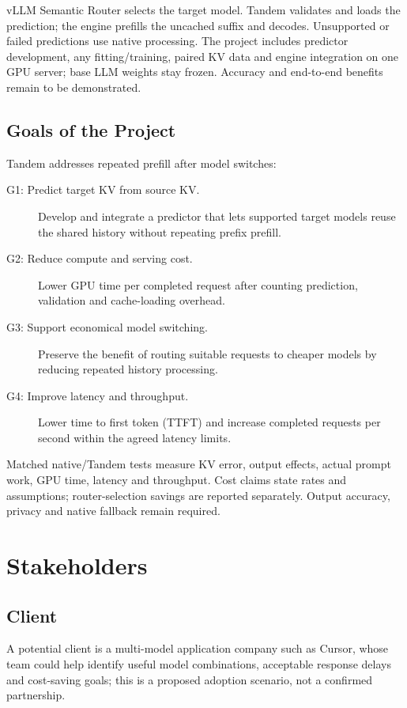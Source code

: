 \documentclass[12pt]{article}
\begin{document}
vLLM Semantic Router selects the target model.
Tandem validates and loads the prediction; the engine prefills the uncached
suffix and decodes. Unsupported or failed predictions use native processing.
The project includes predictor development, any fitting/training, paired KV
data and engine integration on one GPU server; base LLM weights stay frozen.
Accuracy and end-to-end benefits remain to be demonstrated.


\subsection{Goals of the Project}
Tandem addresses repeated prefill after model switches:
\begin{description}
\item[G1: Predict target KV from source KV.] Develop and integrate a predictor
that lets supported target models reuse the shared history without repeating
prefix prefill.
\item[G2: Reduce compute and serving cost.] Lower GPU time per completed
request after counting prediction, validation and cache-loading overhead.
\item[G3: Support economical model switching.] Preserve the benefit of routing
suitable requests to cheaper models by reducing repeated history processing.
\item[G4: Improve latency and throughput.] Lower time to first token (TTFT)
and increase completed requests per second within the agreed latency limits.
\end{description}
Matched native/Tandem tests measure KV error, output effects, actual prompt
work, GPU time, latency and throughput. Cost claims state rates and assumptions;
router-selection savings are reported separately. Output accuracy, privacy
and native fallback remain required.


\section{Stakeholders}


\subsection{Client}
A potential client is a multi-model application company such as
Cursor, whose team could help identify useful
model combinations, acceptable response delays and cost-saving goals; this
is a proposed adoption scenario, not a confirmed partnership.
\end{document}

